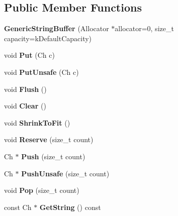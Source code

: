 \subsection*{Public Member Functions}
\begin{DoxyCompactItemize}
\item 
\mbox{\label{a02208_a62f5ea1a53a2a3f98088f8c152b6183e}} 
{\bfseries Generic\+String\+Buffer} (Allocator $\ast$allocator=0, size\+\_\+t capacity=k\+Default\+Capacity)
\item 
\mbox{\label{a02208_a8be5c8fadccacdcf40e20220f38e0afa}} 
void {\bfseries Put} (Ch c)
\item 
\mbox{\label{a02208_a9225468d11fdddfc3a9a4e48bf4d3ba4}} 
void {\bfseries Put\+Unsafe} (Ch c)
\item 
\mbox{\label{a02208_a28bb539487db17b07314a532f3b8847c}} 
void {\bfseries Flush} ()
\item 
\mbox{\label{a02208_a42f15c959046d899cb74c3120a6995f9}} 
void {\bfseries Clear} ()
\item 
\mbox{\label{a02208_a0dbdb77489b95923795011a24f705be5}} 
void {\bfseries Shrink\+To\+Fit} ()
\item 
\mbox{\label{a02208_a4d6becae201b98c122746298882a318f}} 
void {\bfseries Reserve} (size\+\_\+t count)
\item 
\mbox{\label{a02208_a49fd10cdd5dd97a4cf9813d01334d660}} 
Ch $\ast$ {\bfseries Push} (size\+\_\+t count)
\item 
\mbox{\label{a02208_a4e396f55323ca54f949685c7c6ef2060}} 
Ch $\ast$ {\bfseries Push\+Unsafe} (size\+\_\+t count)
\item 
\mbox{\label{a02208_a0038e53ba03c271bc4cbbac403ec4de4}} 
void {\bfseries Pop} (size\+\_\+t count)
\item 
\mbox{\label{a02208_ab06b8c5f1385bd3dfd4caea8b7510f0b}} 
const Ch $\ast$ {\bfseries Get\+String} () const
\item 
\mbox{\label{a02208_a725e862b9a78375f5363b0b61ad789f3}} 

\end{DoxyCompactItemize}
